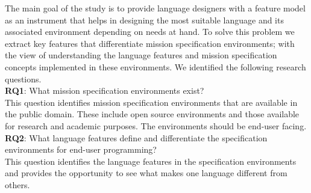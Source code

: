 \noindent 
The main goal of the study is to provide language designers with a feature model as an instrument that helps in designing the most suitable language and its associated environment depending on needs at hand. To solve this problem we extract key features that differentiate mission specification environments; with the view of understanding the language features and mission specification concepts implemented in these environments. We identified the following research questions.\\
\noindent
\textbf{RQ1}: What mission specification environments exist?\\
This question identifies mission specification environments that are available in the public domain.
These include open source environments and those available for research and academic purposes. The environments should be end-user facing.
\\
\textbf{RQ2}: What language features define and differentiate the specification environments for end-user programming?\\
This question identifies the language features in the specification environments and provides the opportunity to see what makes one language different from others.\\
